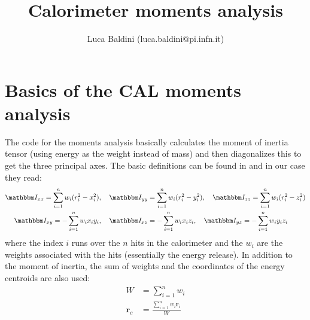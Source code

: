 \documentclass[a4paper,11pt]{article}
\title{Calorimeter moments analysis}
\author{Luca Baldini (luca.baldini@pi.infn.it)}
\newcommand{\itm}{\mathbbm I}
\newcommand{\itc}[1]{\itm_{#1}}
\begin{document}
\maketitle



\section{Basics of the CAL moments analysis}

The code for the moments analysis basically calculates the moment of inertia
tensor (using energy as the weight instead of mass) and then diagonalizes this
to get the three principal axes. The basic definitions can be found in
\cite{goldstein,landau} and in our case they read:
\begin{align}
  \itc{xx}  = \sum_{i=1}^n w_i(r_i^2 - x_i^2),\quad
  \itc{yy} &= \sum_{i=1}^n w_i(r_i^2 - y_i^2),\quad
  \itc{zz}  = \sum_{i=1}^n w_i(r_i^2 - z_i^2)\\
  \itc{xy}  = -\sum_{i=1}^n w_ix_iy_i,\quad
  \itc{xz} &= -\sum_{i=1}^n w_ix_iz_i,\quad
  \itc{yz}  = -\sum_{i=1}^n w_iy_iz_i
\end{align}
where the index $i$ runs over the $n$ hits in the calorimeter and the $w_i$ are
the weights associated with the hits (essentially the energy release).
In addition to the moment of inertia, the sum of weights and the coordinates
of the energy centroids are also used:
\begin{align}
  W &= \sum_{i=1}^n w_i\\
  \mathbf{r}_c &= \frac{\sum_{i=1}^n w_i\mathbf{r}_i}{W}
\end{align}
\end{document}
